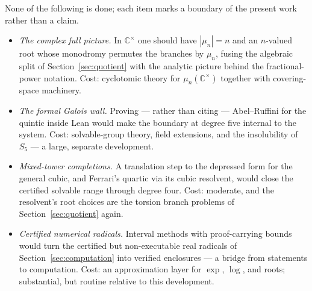 \documentclass[submission,noinfoline]{jsfds}
\begin{document}
None of the following is done; each item marks a boundary of the present
work rather than a claim.
\begin{itemize}
\item \emph{The complex full picture.} In $\mathbb C^\times$ one should
have $|\mu_n|=n$ and an $n$-valued root whose monodromy permutes the
branches by $\mu_n$, fusing the algebraic split of
Section~\ref{sec:quotient} with the analytic picture behind the
fractional-power notation. Cost: cyclotomic theory for
$\mu_n(\mathbb C^\times)$ together with covering-space machinery.
\item \emph{The formal Galois wall.} Proving --- rather than citing ---
Abel--Ruffini for the quintic inside Lean would make the boundary at
degree five internal to the system. Cost: solvable-group theory, field
extensions, and the insolubility of $S_5$ --- a large, separate
development.
\item \emph{Mixed-tower completions.} A translation step to the
depressed form for the general cubic, and Ferrari's quartic via its
cubic resolvent, would close the certified solvable range through degree
four. Cost: moderate, and the resolvent's root choices are the torsion
branch problems of Section~\ref{sec:quotient} again.
\item \emph{Certified numerical radicals.} Interval methods with
proof-carrying bounds would turn the certified but non-executable real
radicals of Section~\ref{sec:computation} into verified enclosures ---
a bridge from statements to computation. Cost: an approximation layer
for $\exp$, $\log$, and roots; substantial, but routine relative to this
development.
\end{itemize}


\end{document}

